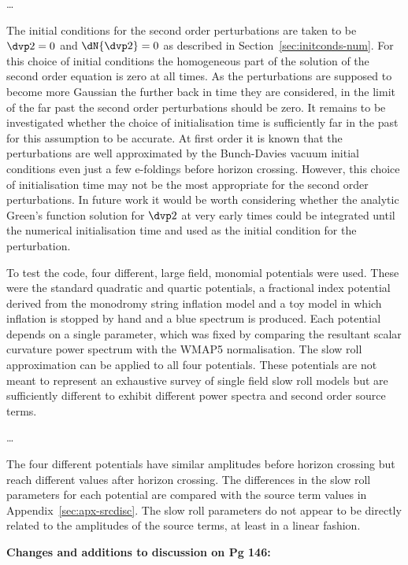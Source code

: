 \ldots

The initial conditions for the second order perturbations are taken to be $\dvp2=0$ and
$\dN{\dvp2}=0$ as described in Section~\ref{sec:initconds-num}. For this choice of initial
conditions the homogeneous part of the solution of the second order equation is zero at all times.
As the perturbations are supposed to become more Gaussian the further back in time they are
considered, in the limit of the far past the second order perturbations should be zero. It remains
to be investigated whether the choice of initialisation time is sufficiently far in the past for
this assumption to be accurate. At first order it is known that the perturbations are well
 approximated by the Bunch-Davies vacuum initial conditions even just a few e-foldings before
horizon crossing. However, this choice of initialisation time may not be the most appropriate for
the second order perturbations. In future work it would be worth considering whether the analytic
Green's function solution for $\dvp2$ at very early times could be integrated until the numerical
initialisation time and used as the initial condition for the perturbation. 

To test the code, four different, large field, monomial potentials were used. These were the
standard quadratic and quartic potentials, a fractional index potential derived from the monodromy
string inflation model and a toy model in which inflation is stopped by hand and a blue spectrum is
produced.
Each potential depends on a single parameter, which was fixed by comparing the resultant scalar
curvature power spectrum with the WMAP5 normalisation. The slow roll
approximation can be applied to all four potentials. These potentials are not meant to represent an
exhaustive survey of single field slow roll models but are sufficiently different to exhibit
different power spectra and second order source terms.

\ldots

The four different potentials have similar amplitudes before horizon crossing but reach different
values after horizon crossing. The differences in the slow roll parameters for each potential are
compared with the source term values in Appendix~\ref{sec:apx-srcdisc}. The slow roll parameters
do not appear to be directly related to the amplitudes of the source terms, at least in a linear
fashion.


\textbf{Changes and additions to discussion on Pg 146:}


